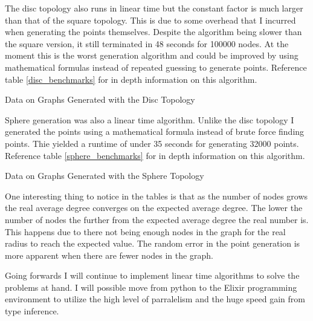 \documentclass{article}
\begin{document}
	The disc topology also runs in linear time but the constant factor is much larger than that of the square topology.
	This is due to some overhead that I incurred when generating the points themselves.
	Despite the algorithm being slower than the square version, it still terminated in 48 seconds for 100000 nodes.
  At the moment this is the worst generation algorithm and could be improved by using mathematical formulas instead of repeated guessing to generate points.
  Reference table \ref{disc_benchmarks} for in depth information on this algorithm.

  \begin{center}
	  \begin{table}
      \label{disc_benchmarks}
			\caption{Data on Graphs Generated with the Disc Topology}
		\end{table}
	\end{center}

  Sphere generation was also a linear time algorithm.
  Unlike the disc topology I generated the points using a mathematical formula instead of brute force finding points.
  Thie yielded a runtime of under 35 seconds for generating 32000 points.
  Reference table \ref{sphere_benchmarks} for in depth information on this algorithm.

  \begin{center}
	  \begin{table}
      \label{sphere_benchmarks}
			\caption{Data on Graphs Generated with the Sphere Topology}
		\end{table}
	\end{center}

	One interesting thing to notice in the tables is that as the number of nodes grows the real average degree converges on the expected average degree.
	The lower the number of nodes the further from the expected average degree the real number is.
	This happens due to there not being enough nodes in the graph for the real radius to reach the expected value.
  The random error in the point generation is more apparent when there are fewer nodes in the graph.

	Going forwards I will continue to implement linear time algorithms to solve the problems at hand.
	I will possible move from python to the Elixir programming environment to utilize the high level of parralelism and the huge speed gain from type inference.
\end{document}
